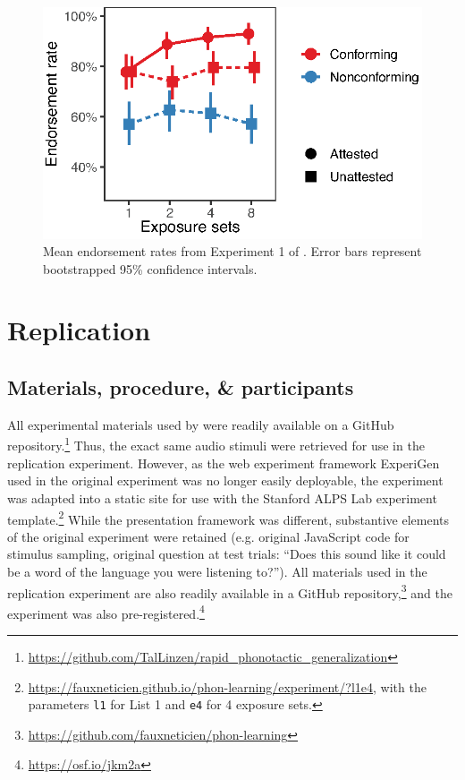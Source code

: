 \documentclass[letterpaper,11pt]{article}
\begin{document}
\begin{figure}[h]
\center
\includegraphics[scale=0.85]{../analysis/figures/LnG-results.eps}
\caption{Mean endorsement rates from Experiment 1 of \textcite{linzen2017rapid}. Error bars represent bootstrapped 95\% confidence intervals.}
\label{fig:lng}
\end{figure}

\section{Replication}

\subsection{Materials, procedure, \& participants}

All experimental materials used by \textcite{linzen2017rapid} were readily available on a GitHub repository.\footnote{\url{https://github.com/TalLinzen/rapid_phonotactic_generalization}}
Thus, the exact same audio stimuli were retrieved for use in the replication experiment.
However, as the web experiment framework ExperiGen used in the original experiment was no longer easily deployable, the experiment was adapted into a static site for use with the Stanford ALPS Lab experiment template.\footnote{\url{https://fauxneticien.github.io/phon-learning/experiment/?l1e4}, with the parameters \texttt{l1} for List 1 and \texttt{e4} for 4 exposure sets.}
While the presentation framework was different, substantive elements of the original experiment were retained (e.g. original JavaScript code for stimulus sampling, original question at test trials: ``Does this sound like it could be a word of the language you were listening to?'').
All materials used in the replication experiment are also readily available in a GitHub repository,\footnote{\url{https://github.com/fauxneticien/phon-learning}} and the experiment was also pre-registered.\footnote{\url{https://osf.io/jkm2a}}
\end{document}
